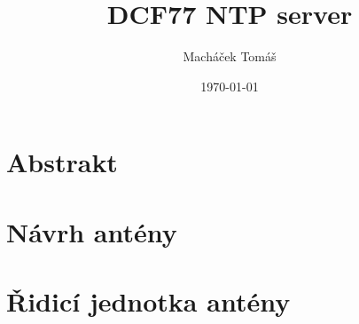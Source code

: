 \documentclass[12pt]{report}
\title{DCF77 NTP server}
\author{Macháček Tomáš}
\date{\today}
\begin{document}




\tableofcontents

\chapter{Abstrakt}


\chapter{Návrh antény}


\chapter{Řidicí jednotka antény}

\end{document}
